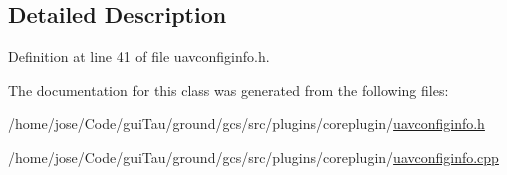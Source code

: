 \subsection{Detailed Description}


Definition at line 41 of file uavconfiginfo.\-h.



The documentation for this class was generated from the following files\-:\begin{DoxyCompactItemize}
\item 
/home/jose/\-Code/gui\-Tau/ground/gcs/src/plugins/coreplugin/\hyperlink{uavconfiginfo_8h}{uavconfiginfo.\-h}\item 
/home/jose/\-Code/gui\-Tau/ground/gcs/src/plugins/coreplugin/\hyperlink{uavconfiginfo_8cpp}{uavconfiginfo.\-cpp}\end{DoxyCompactItemize}
